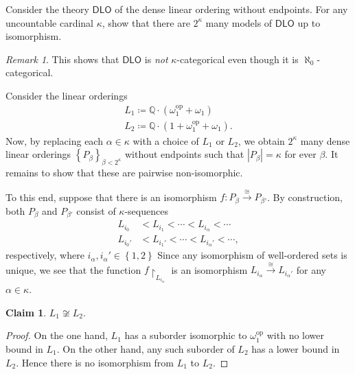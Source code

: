\documentclass[10pt,letterpaper,cm]{nupset}
\theoremstyle{definition}
\theoremstyle{theorem}
\newtheorem{claim}{Claim}
\theoremstyle{remark}
\newtheorem*{remark}{Remark}
\newcommand{\Q}{\mathbb Q}
\newcommand{\1}{\mathbb{1}}
\newcommand{\0}{\vec 0}
\DeclareMathOperator{\op}{op}
\begin{document}
\begin{problem}[5.]
Consider the theory $\mathsf{DLO}$ of the dense linear ordering without endpoints. For any uncountable cardinal $\kappa$, show that there are $2^{\kappa}$ many models of $\mathsf{DLO}$ up to isomorphism.
\begin{remark}
This shows that $\mathsf{DLO}$ is \emph{not} $\kappa$-categorical even though it is $\aleph_0$-categorical.
\end{remark}
\end{problem}
\begin{solution}
Consider the linear orderings 
\begin{gather*}
L_1 \coloneqq \Q \cdot \left(\omega_1^{\op} + \omega_1  \right)
\\ L_2\coloneqq  \Q \cdot \left(1+ \omega_1^{\op} + \omega_1 \right).
\end{gather*}
Now, by replacing each $\alpha \in \kappa$ with a choice of $L_1$ or $L_2$, we obtain $2^{\kappa}$ many dense linear orderings $\left\{P_{\beta}\right\}_{\beta< 2^{\kappa}}$ without endpoints such that $\left\lvert{P_{\beta}}\right\rvert=\kappa$ for ever $\beta$. It remains to show that these are pairwise non-isomorphic.

\smallskip

To this end, suppose that there is an isomorphism $f: P_{\beta} \overset{\cong}{\longrightarrow} P_{\beta'}$. By construction, both $P_{\beta}$ and $P_{\beta'}$ consist of $\kappa$-sequences 
\begin{align*}
L_{i_0} & < L_{i_1} < \cdots < L_{i_{\alpha}} < \cdots
\\ L_{i_0'} & < L_{i_1'} < \cdots < L_{i_{\alpha}'} < \cdots, 
\end{align*}
respectively, where $i_{\alpha}, i_{\alpha}'\in \left\{1,2\right\}$ Since any isomorphism of well-ordered sets is unique, we see that the function $f\restriction_{L_{i_{\alpha}}}$ is an isomorphism $L_{i_{\alpha}} \overset{\cong}{\longrightarrow} L_{i_{\alpha}'}$ for any $\alpha \in \kappa$.

\begin{claim}
$L_1 \not\cong L_2$.
\end{claim}
\begin{proof}
On the one hand,  $L_1$ has a suborder isomorphic to $\omega_1^{\op}$ with no lower bound in $L_1$. On the other hand, any such suborder of $L_2$ has a lower bound in $L_2$. Hence there is no isomorphism from $L_1$ to $L_2$.
\end{proof}


\end{solution}
\end{document}
